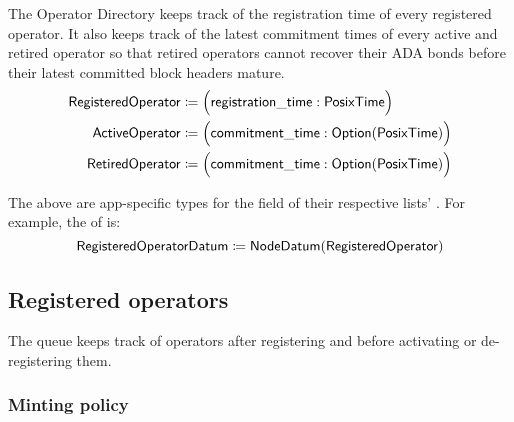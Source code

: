 \documentclass[../midgard.tex]{subfiles}
\begin{document}
The Operator Directory keeps track of the registration time of every registered operator.
It also keeps track of the latest commitment times of every active and retired operator so that retired operators cannot recover their ADA bonds before their latest committed block headers mature.
\begin{align*}
    \mathsf{RegisteredOperator} &\coloneq \Bigl( \mathsf{registration\_time}: \mathsf{PosixTime} \Bigr) \\
    \mathsf{ActiveOperator}     &\coloneq \Bigl( \mathsf{commitment\_time}:
        \mathsf{Option}(\mathsf{PosixTime}) \Bigr) \\
    \mathsf{RetiredOperator}    &\coloneq \Bigl( \mathsf{commitment\_time}:
        \mathsf{Option}(\mathsf{PosixTime}) \Bigr)
\end{align*}

The above are app-specific types for the  field of their respective lists' .
For example, the  of  is:
\begin{equation*}
    \mathsf{RegisteredOperatorDatum} \coloneq \mathsf{NodeDatum} (\mathsf{RegisteredOperator})
\end{equation*}

\subsection{Registered operators}
\label{h:registered-operators}

The  queue keeps track of operators after registering and before activating or de-registering them.

\subsubsection{Minting policy}
\label{h:registered-operators-minting-policy}
\end{document}
